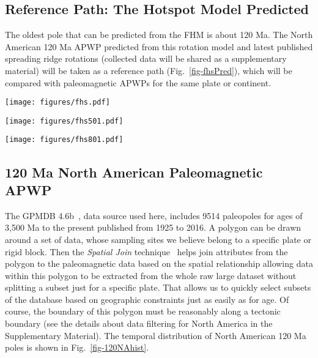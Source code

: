 \subsection{Reference Path: The Hotspot Model Predicted}

The oldest pole that can be predicted from the FHM is about 120 Ma. The North
American 120 Ma APWP predicted from this rotation model and
latest published spreading ridge rotations (collected data will be shared as a
supplementary material) will be taken as a reference path
(Fig.~\ref{fig-fhsPred}), which will be compared with paleomagnetic APWPs for
the same plate or continent.

\begin{figure*}
\centering
\texttt{[image: figures/fhs.pdf]}
\caption[120 Ma FHM predicted APWP of North America]{FHM
predicted 120 Ma APWP for $NAC$ through the North
America\textendash{}Nubia\textendash{}Mantle plate circuit. Its age step is 5
Myr.}\label{fig-fhsPred}
\end{figure*}

\begin{figure*}
\centering
\texttt{[image: figures/fhs501.pdf]}
\caption[120 Ma FHM predicted APWP of India]{FHM predicted
120 Ma APWP for India through the
India\textendash{}Somalia\textendash{}Nubia\textendash{}Mantle plate circuit.
Its age step is 5 Myr.}\label{fig-fhsPred501}
\end{figure*}

\begin{figure*}
\centering
\texttt{[image: figures/fhs801.pdf]}
\caption[120 Ma FHM predicted APWP of Australia]{FHM predicted
120 Ma APWP for Australia through the Australia\textendash{}East
Antarctica\textendash{}Somalia\textendash{}Nubia\textendash{}Mantle plate
circuit. Its age step is 5 Myr.}\label{fig-fhsPred801}
\end{figure*}

\subsection{120 Ma North American Paleomagnetic APWP}

The GPMDB 4.6b~\cite{P05}, data source used here, includes 9514 paleopoles for
ages of 3,500 Ma to the present published from 1925 to 2016. A polygon can be
drawn around a set of data, whose sampling sites we believe belong to a specific
plate or rigid block. Then the {\em Spatial Join\/} technique~\cite{J07} helps
join attributes from the polygon to the paleomagnetic data based on the spatial
relationship allowing data within this polygon to be extracted from the whole
raw large dataset without splitting a subset just for a specific plate. That
allows us to quickly select subsets of the database based on geographic
constraints just as easily as for age. Of course, the boundary of this polygon
must be reasonably along a tectonic boundary (see the details about data
filtering for North America in the Supplementary Material). The temporal
distribution of North American 120 Ma poles is shown in
Fig.~\ref{fig-120NAhist}.

